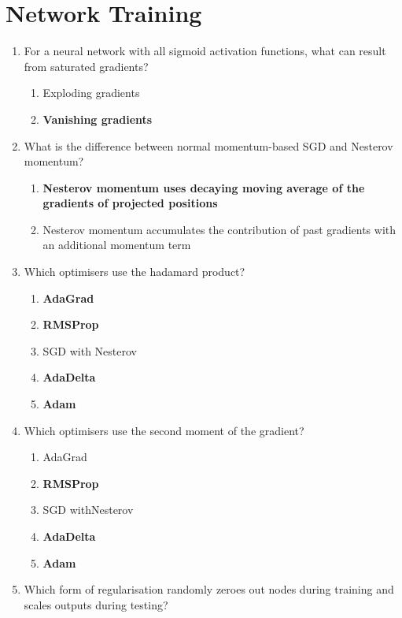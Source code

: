 \documentclass{report}
\numberwithin{equation}{section}
\begin{document}
\section{Network Training}
\begin{enumerate}
    \item For a neural network with all sigmoid activation functions, what can result from saturated gradients?
    \begin{enumerate}[label=\alph*.]
        \item Exploding gradients
        \item \textbf{Vanishing gradients}
    \end{enumerate}
    \item What is the difference between normal momentum-based SGD and Nesterov momentum?
    \begin{enumerate}[label=\alph*.]
        \item \textbf{Nesterov momentum uses decaying moving average of the gradients of projected positions}
        \item Nesterov momentum accumulates the contribution of past gradients with an additional momentum term
    \end{enumerate}
        \item Which optimisers use the hadamard product?
    \begin{enumerate}[label=\alph*.]
        \item \textbf{AdaGrad}
        \item \textbf{RMSProp}
        \item SGD with Nesterov
        \item \textbf{AdaDelta}
        \item \textbf{Adam}
    \end{enumerate}
        \item Which optimisers use the second moment of the gradient?
    \begin{enumerate}[label=\alph*.]
        \item AdaGrad
        \item \textbf{RMSProp}
        \item SGD withNesterov
        \item \textbf{AdaDelta}
        \item \textbf{Adam}
    \end{enumerate}
        \item Which form of regularisation randomly zeroes out nodes during training and scales outputs during testing?
    \begin{enumerate}[label=\alph*.]

\end{enumerate}
\end{enumerate}
\end{document}
